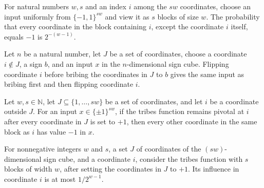 \begin{theorem}
\label{FABL.uniformProbability_tribesRestTrue}
\leanok
{}
For natural numbers $w,s$ and an index $i$ among the $sw$ coordinates, choose an input
uniformly from $\{−1,1\}^{sw}$ and view it as $s$ blocks of size $w$. The probability
that every coordinate in the block containing $i$, except the coordinate $i$ itself,
equals $−1$ is $2^{-(w-1)}$.
\end{theorem}

\begin{theorem}
\label{FABL.bribeInput_flipCoordinate_of_not_mem}
\leanok
{}
Let $n$ be a natural number, let $J$ be a set of coordinates, choose a coordinate
$i\notin J$, a sign $b$, and an input $x$ in the $n$-dimensional sign cube. Flipping
coordinate $i$ before bribing the coordinates in $J$ to $b$ gives the same input as
bribing first and then flipping coordinate $i$.
\end{theorem}

\begin{theorem}
\label{FABL.isPivotal_bribeFunction_tribes_imp_restTrue}
\leanok
{}
Let $w,s\in\mathbb N$, let $J\subseteq\{1,\ldots,sw\}$ be a set of coordinates, and let
$i$ be a coordinate outside $J$. For an input $x\in\{\pm1\}^{sw}$, if the tribes
function remains pivotal at $i$ after every coordinate in $J$ is set to $+1$, then every
other coordinate in the same block as $i$ has value $-1$ in $x$.
\end{theorem}

\begin{theorem}
\label{FABL.booleanInfluence_bribeFunction_tribes_le}
\leanok
{}
For nonnegative integers $w$ and $s$, a set $J$ of coordinates of the $(sw)$-dimensional
sign cube, and a coordinate $i$, consider the tribes function with $s$ blocks of width
$w$, after setting the coordinates in $J$ to $+1$. Its influence in coordinate $i$ is at
most $1/2^{w-1}$.
\end{theorem}

